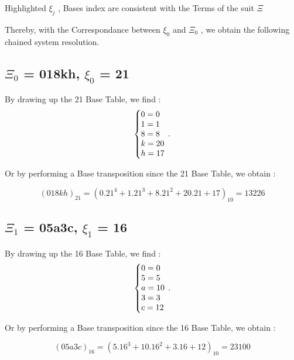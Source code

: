 \documentclass{article}
\begin{document}
\begin{flushleft}
	Highlighted $\xi_{j}$ , Bases index are consistent with the Terms of the suit $\Xi$

Thereby, with the Correspondance between $ \xi_{0}$ and $\Xi_{0}$ , we obtain the following chained system resolution.
\end{flushleft}

\subsection{$\Xi_{0}$ = 018kh, $\xi_{0}$ = 21}
By drawing up the 21 Base Table, we find :
\begin{equation}
\centering
\left\{\begin{array}{@{}l@{}}
0=0 \\
1=1 \\
8=8 \\
k=20 \\
h=17 \\
\end{array}\right.\,.
\end{equation}

\begin{flushleft}
	Or by performing a Base transposition since the 21 Base Table, we obtain :
\end{flushleft}
\begin{equation}
(018kh)_{21}=(0.21^{4}+1.21^{3}+8.21^{2}+20.21+17)_{10}=13226
\end{equation}

\subsection{$\Xi_{1}$ = 05a3c, $\xi_{1}$ = 16}
By drawing up the 16 Base Table, we find :
\begin{equation}
\centering
\left\{\begin{array}{@{}l@{}}
0=0 \\
5=5 \\
a=10 \\
3=3 \\
c=12 \\
\end{array}\right.\,.
\end{equation}

\begin{flushleft}
	Or by performing a Base transposition since the 16 Base Table, we obtain :
\end{flushleft}
\begin{equation}
(05a3c)_{16}=(5.16^{3}+10.16^{2}+3.16+12)_{10}=23100
\end{equation}
\end{document}
